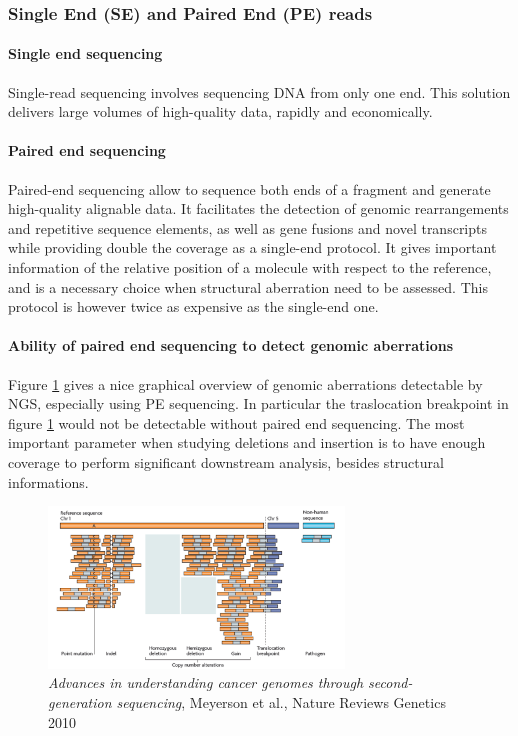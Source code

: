 		\subsubsection{Single End (SE) and Paired End (PE) reads} \label{SE_PE}

			\paragraph{Single end sequencing}
			Single-read sequencing involves sequencing DNA from only one end.
			This solution delivers large volumes of high-quality data, rapidly and economically.

			\paragraph{Paired end sequencing}
			Paired-end sequencing allow to sequence both ends of a fragment and generate high-quality alignable data.
			It facilitates the detection of genomic rearrangements and repetitive sequence elements, as well as gene fusions and novel transcripts while providing double the coverage as a single-end protocol.
			It gives important information of the relative position of a molecule with respect to the reference, and is a necessary choice when structural aberration need to be assessed.
			This protocol is however twice as expensive as the single-end one.

			\paragraph{Ability of paired end sequencing to detect genomic aberrations}
			Figure \ref{fig:igv} gives a nice graphical overview of genomic aberrations detectable by NGS, especially using PE sequencing.
			In particular the traslocation breakpoint in figure \ref{fig:igv} would not be detectable without paired end sequencing.
			The most important parameter when studying deletions and insertion is to have enough coverage to perform significant downstream analysis, besides structural informations.

			\begin{figure}[H]
					\centering
					\includegraphics[width=0.7\textwidth]{igv.png}
					\caption{\textit{Advances in understanding cancer genomes through second-generation sequencing}, Meyerson et al., Nature Reviews Genetics 2010}
					\label{fig:igv}
			\end{figure}
